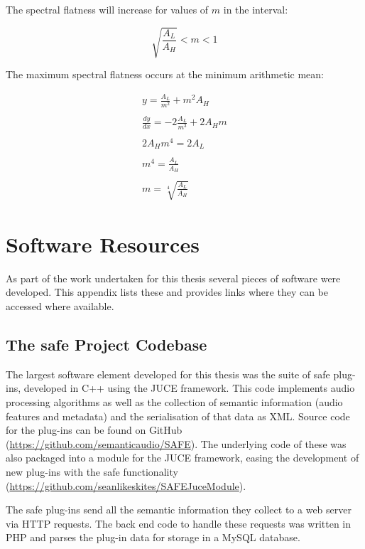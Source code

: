 \begin{appendices}
		The spectral flatness will increase for values of $m$ in the interval:

		\[ \sqrt{\frac{A_{L}}{A_{H}}} < m < 1 \]

		The maximum spectral flatness occurs at the minimum arithmetic mean:

		\begin{gather}
			y = \frac{A_{L}}{m^{2}} + m^{2}A_{H} \nonumber \\
			\nonumber \\
			\frac{dy}{dx} = -2\frac{A_{L}}{m^{3}} + 2A_{H}m \nonumber \\
			\nonumber \\
			2A_{H}m^{4} = 2A_{L} \nonumber \\
			\nonumber \\
			m^{4} = \frac{A_{L}}{A_{H}} \nonumber \\
			\nonumber \\
			m = \sqrt[4]{\frac{A_{L}}{A_{H}}} \nonumber
		\end{gather}

\chapter{Software Resources}
	As part of the work undertaken for this thesis several pieces of software were developed. This appendix lists these
	and provides links where they can be accessed where available.
	
	\section{The \acrshort{safe} Project Codebase}
		The largest software element developed for this thesis was the suite of \acrshort{safe} plug-ins, developed
		in C++ using the JUCE framework. This code implements audio processing algorithms as well as the collection
		of semantic information (audio features and metadata) and the serialisation of that data as XML. Source code
		for the plug-ins can be found on GitHub
		(\href{https://github.com/semanticaudio/SAFE}{https://github.com/semanticaudio/SAFE}). The underlying code
		of these was also packaged into a module for the JUCE framework, easing the development of new plug-ins with
		the \acrshort{safe} functionality
		(\href{https://github.com/seanlikeskites/SAFEJuceModule}{https://github.com/seanlikeskites/SAFEJuceModule}).

		The \acrshort{safe} plug-ins send all the semantic information they collect to a web server via HTTP
		requests. The back end code to handle these requests was written in PHP and parses the plug-in data for
		storage in a MySQL database.


\end{appendices}
